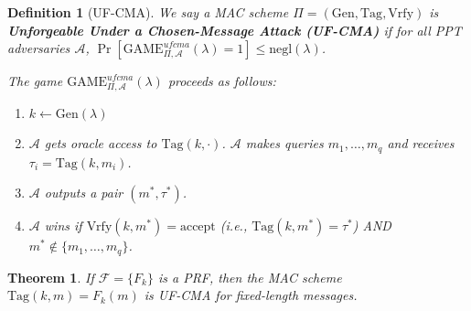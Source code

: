 \documentclass[11pt, a4paper]{article}
\newcommand{\negl}{\text{negl}}
\newcommand{\game}{\text{GAME}}
\newtheorem{thm}{Theorem}
\newtheorem{defn}{Definition}
\begin{document}
\begin{defn}[UF-CMA]
We say a MAC scheme $\Pi = (\text{Gen}, \text{Tag}, \text{Vrfy})$ is \textbf{Unforgeable Under a Chosen-Message Attack (UF-CMA)} if for all PPT adversaries $\mathcal{A}$, $\Pr[\game_{\Pi, \mathcal{A}}^{ufcma}(\lambda) = 1] \le \negl(\lambda)$. 

The game $\game_{\Pi, \mathcal{A}}^{ufcma}(\lambda)$ proceeds as follows: 
\begin{enumerate}
    \item $k \leftarrow \text{Gen}(\lambda)$ 
    \item $\mathcal{A}$ gets oracle access to $\text{Tag}(k, \cdot)$. $\mathcal{A}$ makes queries $m_1, \dots, m_q$ and receives $\tau_i = \text{Tag}(k, m_i)$. 
    \item $\mathcal{A}$ outputs a pair $(m^*, \tau^*)$. 
    \item $\mathcal{A}$ wins if $\text{Vrfy}(k, m^*) = \text{accept}$ (i.e., $\text{Tag}(k, m^*) = \tau^*$) AND $m^* \notin \{m_1, \dots, m_q\}$. 
\end{enumerate}
\end{defn}

\begin{thm}
If $\mathcal{F} = \{F_k\}$ is a PRF, then the MAC scheme $\text{Tag}(k, m) = F_k(m)$ is UF-CMA for fixed-length messages. 
\end{thm}
\end{document}
